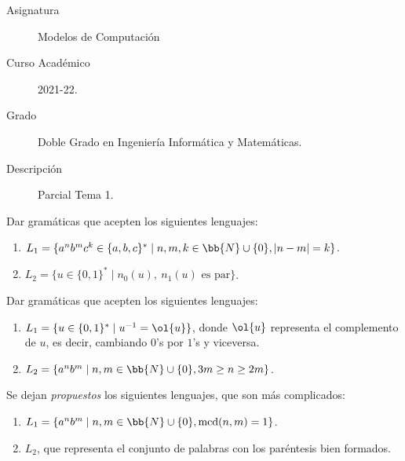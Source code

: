 \documentclass[12pt]{article}
\begin{document}

    
    

    \begin{description}
        \item[Asignatura] Modelos de Computación
        \item[Curso Académico] 2021-22.
        \item[Grado] Doble Grado en Ingeniería Informática y Matemáticas.
        \item[Descripción] Parcial Tema 1.
    \end{description}
    \newpage
    
    \begin{ejercicio}
        Dar gramáticas que acepten los siguientes lenguajes:
        \begin{enumerate}
            \item $L_1 = \{a^nb^mc^k \in \{a,b,c\}^\ast \mid n,m,k\in \bb{N}\cup\{0\}, |n-m|=k\}$.
            \item $L_2 = \{u\in \{0,1\}^\ast \mid n_0(u),~n_1(u)\text{ es par}\}$.
        \end{enumerate}
    \end{ejercicio}

    \begin{ejercicio}
        Dar gramáticas que acepten los siguientes lenguajes:
        \begin{enumerate}
            \item $L_1 = \{u\in \{0,1\}^\ast \mid u^{-1}=\ol{u}\}$, donde $\ol{u}$ representa el complemento de $u$, es decir, cambiando $0$'s por $1$'s y viceversa.
            \item $L_2 = \{a^nb^m \mid n,m\in \bb{N}\cup\{0\}, 3m\geq n\geq 2m\}$.
        \end{enumerate}
    \end{ejercicio}

    \begin{ejercicio}
        Se dejan \emph{propuestos} los siguientes lenguajes, que son más complicados:
        \begin{enumerate}
            \item $L_1 = \{a^nb^m \mid n,m\in \bb{N}\cup\{0\}, \operatorname{mcd}(n,m)=1\}$.
            \item $L_2$, que representa el conjunto de palabras con los paréntesis bien formados.
        \end{enumerate}
        
    \end{ejercicio}
\end{document}
